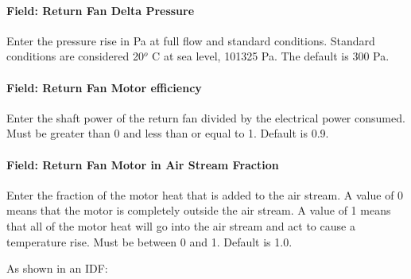 \paragraph{Field: Return Fan Delta Pressure}\label{field-return-fan-delta-pressure-5}

Enter the pressure rise in Pa at full flow and standard conditions. Standard conditions are considered 20\(^{o}\) C at sea level, 101325 Pa. The default is 300 Pa.

\paragraph{Field: Return Fan Motor efficiency}\label{field-return-fan-motor-efficiency-5}

Enter the shaft power of the return fan divided by the electrical power consumed. Must be greater than 0 and less than or equal to 1. Default is 0.9.

\paragraph{Field: Return Fan Motor in Air Stream Fraction}\label{field-return-fan-motor-in-air-stream-fraction-5}

Enter the fraction of the motor heat that is added to the air stream. A value of 0 means that the motor is completely outside the air stream. A value of 1 means that all of the motor heat will go into the air stream and act to cause a temperature rise. Must be between 0 and 1. Default is 1.0.

As shown in an IDF:

